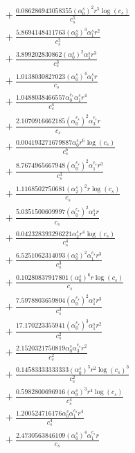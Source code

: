 \documentclass[10pt]{article}
\begin{document}
\begin{align*}
&{}  + \frac{0.086286943058355 \left(\alpha_{0}^s\right)^{2} r^{5} \log{\left(c_{s} \right)}}{c_{s}^{5}} \\
&{}  + \frac{5.8694148411763 \left(\alpha_{0}^s\right)^{3} \alpha_{1}^s r^{2}}{c_{s}^{2}} \\
&{}  + \frac{3.899202830862 \left(\alpha_{0}^s\right)^{2} \alpha_{1}^s r^{3}}{c_{s}^{3}} \\
&{}  + \frac{1.0138030827023 \left(\alpha_{0}^s\right)^{4} \alpha_{1}^s r}{c_{s}} \\
&{}  + \frac{1.0488038466557 \alpha_{0}^{c_s} \alpha_{1}^s r^{4}}{c_{s}^{4}} \\
&{}  + \frac{2.1070916662185 \left(\alpha_{0}^{c_s}\right)^{2} \alpha_{3}^{c_s} r}{c_{s}} \\
&{}  + \frac{0.004193271679887 \alpha_{0}^s r^{6} \log{\left(c_{s} \right)}}{c_{s}^{6}} \\
&{}  + \frac{8.7674965667948 \left(\alpha_{0}^{c_s}\right)^{2} \alpha_{1}^{c_s} r^{3}}{c_{s}^{3}} \\
&{}  + \frac{1.1168502750681 \left(\alpha_{2}^s\right)^{2} r \log{\left(c_{s} \right)}}{c_{s}} \\
&{}  + \frac{5.0351500609997 \left(\alpha_{0}^{c_s}\right)^{2} \alpha_{3}^s r}{c_{s}} \\
&{}  + \frac{0.042328393296221 \alpha_{2}^s r^{4} \log{\left(c_{s} \right)}}{c_{s}^{4}} \\
&{}  + \frac{6.5251062314093 \left(\alpha_{0}^s\right)^{2} \alpha_{1}^{c_s} r^{3}}{c_{s}^{3}} \\
&{}  + \frac{0.10280837917801 \left(\alpha_{0}^s\right)^{6} r \log{\left(c_{s} \right)}}{c_{s}} \\
&{}  + \frac{7.5978803659804 \left(\alpha_{0}^{c_s}\right)^{2} \alpha_{1}^s r^{3}}{c_{s}^{3}} \\
&{}  + \frac{17.170223355941 \left(\alpha_{0}^{c_s}\right)^{3} \alpha_{1}^s r^{2}}{c_{s}^{2}} \\
&{}  + \frac{2.1520321750819 \alpha_{0}^s \alpha_{3}^{c_s} r^{2}}{c_{s}^{2}} \\
&{}  + \frac{0.14583333333333 \left(\alpha_{0}^s\right)^{5} r^{2} \log{\left(c_{s} \right)}^{3}}{c_{s}^{2}} \\
&{}  + \frac{0.5982800696916 \left(\alpha_{0}^s\right)^{3} r^{4} \log{\left(c_{s} \right)}}{c_{s}^{4}} \\
&{}  + \frac{1.200524716176 \alpha_{0}^s \alpha_{1}^{c_s} r^{4}}{c_{s}^{4}} \\
&{}  + \frac{2.4730563846109 \left(\alpha_{0}^s\right)^{4} \alpha_{1}^{c_s} r}{c_{s}} \\

\end{align*}
\end{document}
